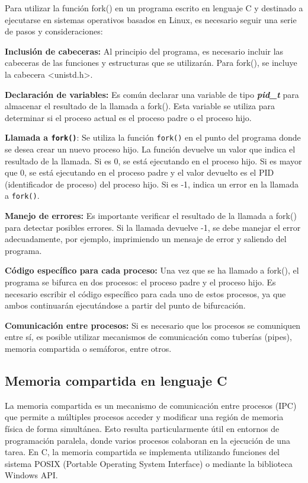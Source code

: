 Para utilizar la función fork() en un programa escrito en lenguaje C y destinado a ejecutarse en sistemas operativos basados en Linux, es necesario seguir una serie de pasos y consideraciones:

\textbf{Inclusión de cabeceras:} Al principio del programa, es necesario incluir las cabeceras de las funciones y estructuras que se utilizarán. Para fork(), se incluye la cabecera \textless unistd.h\textgreater.

\textbf{Declaración de variables:} Es común declarar una variable de tipo \emph{\textbf{pid\_t}} para almacenar el resultado de la llamada a fork(). Esta variable se utiliza para determinar si el proceso actual es el proceso padre o el proceso hijo.

\textbf{Llamada a \texttt{fork()}}: Se utiliza la función \texttt{fork()} en el punto del programa donde se desea crear un nuevo proceso hijo. La función devuelve un valor que indica el resultado de la llamada. Si es 0, se está ejecutando en el proceso hijo. Si es mayor que 0, se está ejecutando en el proceso padre y el valor devuelto es el PID (identificador de proceso) del proceso hijo. Si es -1, indica un error en la llamada a \texttt{fork()}.

\textbf{Manejo de errores:} Es importante verificar el resultado de la llamada a fork() para detectar posibles errores. Si la llamada devuelve -1, se debe manejar el error adecuadamente, por ejemplo, imprimiendo un mensaje de error y saliendo del programa.

\textbf{Código específico para cada proceso:} Una vez que se ha llamado a fork(), el programa se bifurca en dos procesos: el proceso padre y el proceso hijo. Es necesario escribir el código específico para cada uno de estos procesos, ya que ambos continuarán ejecutándose a partir del punto de bifurcación.

\textbf{Comunicación entre procesos:} Si es necesario que los procesos se comuniquen entre sí, es posible utilizar mecanismos de comunicación como tuberías (pipes), memoria compartida o semáforos, entre otros.

\subsection{Memoria compartida en lenguaje C}

La memoria compartida es un mecanismo de comunicación entre procesos (IPC) que permite a múltiples procesos acceder y modificar una región de memoria física de forma simultánea. Esto resulta particularmente útil en entornos de programación paralela, donde varios procesos colaboran en la ejecución de una tarea. En C, la memoria compartida se implementa utilizando funciones del sistema POSIX (Portable Operating System Interface) o mediante la biblioteca Windows API.

